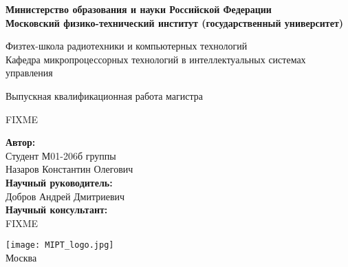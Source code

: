 \begin{center}
    \large\textbf{Министерство образования и науки Российской Федерации \\
    Московский физико-технический институт (государственный
    университет)} \\
    \vspace{1cm}

    Физтех-школа радиотехники и компьютерных технологий \\

    Кафедра микропроцессорных технологий в интеллектуальных системах управления \\

    \vspace{3em}

    Выпускная квалификационная работа магистра
\end{center}

\begin{center}
    \vspace{\fill}
    \LARGE{FIXME}

    \vspace{\fill}
\end{center}


\begin{flushright}
    \textbf{Автор:} \\
    Студент М01-206б группы \\
    Назаров Константин Олегович \\
    \vspace{2em}
    \textbf{Научный руководитель:} \\
    Добров Андрей Дмитриевич  \\
    \vspace{2em}
    \textbf{Научный консультант:} \\
    FIXME \\
\end{flushright}

\vspace{7em}

\begin{center}
    \texttt{[image: MIPT\_logo.jpg]}\\
    Москва \the\year{}
\end{center}

\thispagestyle{empty}

\newpage
\setcounter{page}{2}
\fancyfoot[c]{\thepage}
\fancyhead[R]{}